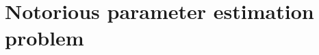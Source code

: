 \documentclass[a4paper,11pt]{report}    %
\newcommand{\psopt}{$\mathcal{PSOPT}$\,}  %
\newcommand{\mt}[1]{\ensuremath \mathbf{#1}}
\newenvironment{shadedframe}{%
  \def\FrameCommand{\fcolorbox{black}{shadecolor}}%
  \MakeFramed {\FrameRestore}}
{\endMakeFramed}
\begin{document}
% 
% 
% 
% 
% 
% 
% 
% 
% 




\section{Notorious parameter estimation problem}
\end{document}
